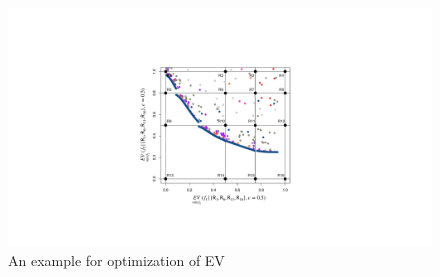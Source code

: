   
 
 
 
 \begin{figure}
     \centering
    \includegraphics[scale=0.4]{Chapter5/Pictures/EV_ZDT1.pdf}
    \caption{An example for optimization of EV}
    \label{fig:eg:EV}
 \end{figure}
 
